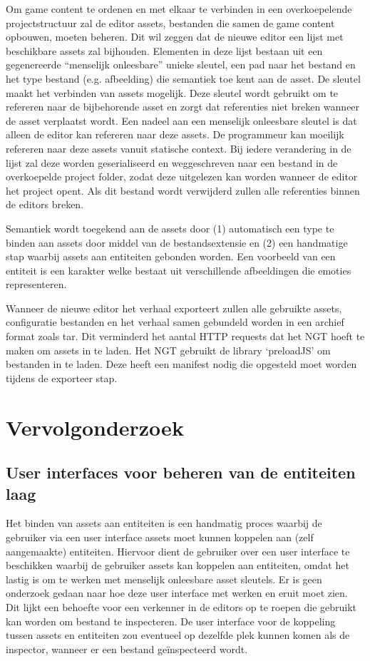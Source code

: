 Om game content te ordenen en met elkaar te verbinden in een overkoepelende projectstructuur zal de editor assets, bestanden die samen de game content opbouwen, moeten beheren. Dit wil zeggen dat de nieuwe editor een lijst met beschikbare assets zal bijhouden. Elementen in deze lijst bestaan uit een gegenereerde “menselijk onleesbare” unieke sleutel, een pad naar het bestand en het type bestand (e.g. afbeelding) die semantiek toe kent aan de asset. De sleutel maakt het verbinden van assets mogelijk. Deze sleutel wordt gebruikt om te refereren naar de bijbehorende asset en zorgt dat referenties niet breken wanneer de asset verplaatst wordt. Een nadeel aan een menselijk onleesbare sleutel is dat alleen de editor kan refereren naar deze assets. De programmeur kan moeilijk refereren naar deze assets vanuit statische context. Bij iedere verandering in de lijst zal deze worden geserialiseerd en weggeschreven naar een bestand in de overkoepelde project folder, zodat deze uitgelezen kan worden wanneer de editor het project opent. Als dit bestand wordt verwijderd zullen alle referenties binnen de editors breken.

Semantiek wordt toegekend aan de assets door (1) automatisch een type te binden aan assets door middel van de bestandsextensie en (2) een handmatige stap waarbij assets aan entiteiten gebonden worden. Een voorbeeld van een entiteit is een karakter welke bestaat uit verschillende afbeeldingen die emoties representeren.

Wanneer de nieuwe editor het verhaal exporteert zullen alle gebruikte assets, configuratie bestanden en het verhaal samen gebundeld worden in een archief format zoals tar. Dit verminderd het aantal HTTP requests dat het NGT hoeft te maken om assets in te laden. Het NGT gebruikt de library ‘preloadJS’ om bestanden in te laden. Deze heeft een manifest nodig die opgesteld moet worden tijdens de exporteer stap.

\section{Vervolgonderzoek}
\subsection{User interfaces voor beheren van de entiteiten laag}
Het binden van assets aan entiteiten is een handmatig proces waarbij de gebruiker via een user interface assets moet kunnen koppelen aan (zelf aangemaakte) entiteiten. Hiervoor dient de gebruiker over een user interface te beschikken waarbij de gebruiker assets kan koppelen aan entiteiten, omdat het lastig is om te werken met menselijk onleesbare asset sleutels. Er is geen onderzoek gedaan naar hoe deze user interface met werken en eruit moet zien. Dit lijkt een behoefte voor een verkenner in de editors op te roepen die gebruikt kan worden om bestand te inspecteren. De user interface voor de koppeling tussen assets en entiteiten zou eventueel op dezelfde plek kunnen komen als de inspector, wanneer er een bestand geïnspecteerd wordt.

